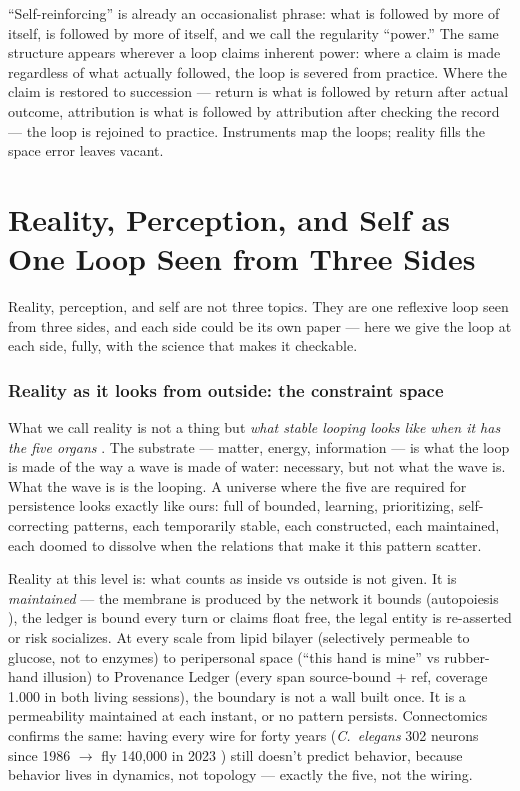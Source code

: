 \documentclass[11pt]{article}
\begin{document}
``Self-reinforcing'' is already an occasionalist phrase: what is followed by more of itself, is followed by more of itself, and we call the regularity ``power.'' The same structure appears wherever a loop claims inherent power: where a claim is made regardless of what actually followed, the loop is severed from practice. Where the claim is restored to succession --- return is what is followed by return after actual outcome, attribution is what is followed by attribution after checking the record --- the loop is rejoined to practice. Instruments map the loops; reality fills the space error leaves vacant.

\section{Reality, Perception, and Self as One Loop Seen from Three Sides}
\label{sec:three-sides}

Reality, perception, and self are not three topics. They are one reflexive loop seen from three sides, and each side could be its own paper --- here we give the loop at each side, fully, with the science that makes it checkable.

\subsubsection{Reality as it looks from outside: the constraint space}

What we call reality is not a thing but \emph{what stable looping looks like when it has the five organs} \citep{maturana1980,tononi2014}. The substrate --- matter, energy, information --- is what the loop is made of the way a wave is made of water: necessary, but not what the wave is. What the wave is is the looping. A universe where the five are required for persistence looks exactly like ours: full of bounded, learning, prioritizing, self-correcting patterns, each temporarily stable, each constructed, each maintained, each doomed to dissolve when the relations that make it this pattern scatter.

Reality at this level is: what counts as inside vs outside is not given. It is \emph{maintained} --- the membrane is produced by the network it bounds (autopoiesis \citep{maturana1980}), the ledger is bound every turn or claims float free, the legal entity is re-asserted or risk socializes. At every scale from lipid bilayer (selectively permeable to glucose, not to enzymes) to peripersonal space (``this hand is mine'' vs rubber-hand illusion) to Provenance Ledger (every span source-bound + ref, coverage 1.000 in both living sessions), the boundary is not a wall built once. It is a permeability maintained at each instant, or no pattern persists. Connectomics confirms the same: having every wire for forty years (\emph{C.~elegans} 302 neurons since 1986 \citep{white1986} $\to$ fly 140,000 in 2023 \citep{dorkenwald2023}) still doesn't predict behavior, because behavior lives in dynamics, not topology --- exactly the five, not the wiring.
\end{document}
